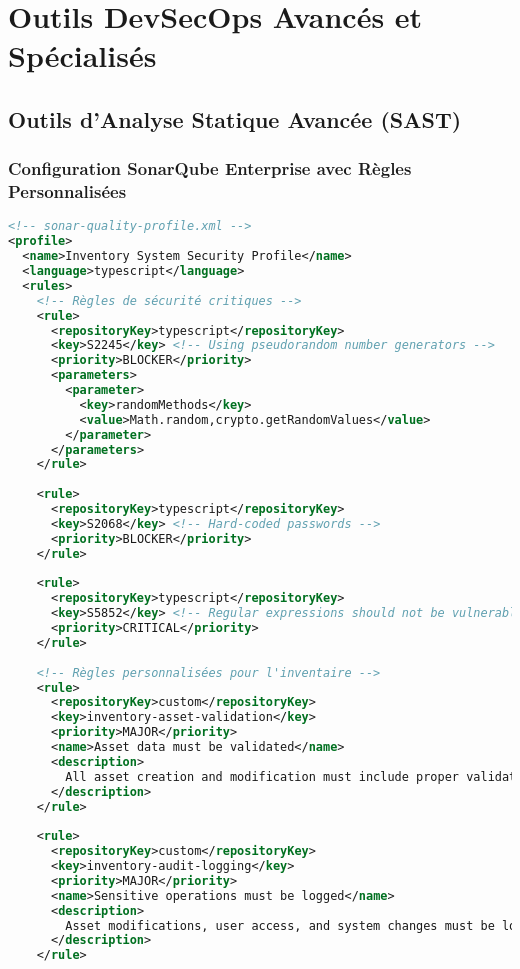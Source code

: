 \documentclass[12pt,a4paper]{report}
\begin{document}
\section{Outils DevSecOps Avancés et Spécialisés}

\subsection{Outils d'Analyse Statique Avancée (SAST)}

\subsubsection{Configuration SonarQube Enterprise avec Règles Personnalisées}

\begin{lstlisting}[language=XML, caption=Configuration SonarQube avancée avec règles métier]
<!-- sonar-quality-profile.xml -->
<profile>
  <name>Inventory System Security Profile</name>
  <language>typescript</language>
  <rules>
    <!-- Règles de sécurité critiques -->
    <rule>
      <repositoryKey>typescript</repositoryKey>
      <key>S2245</key> <!-- Using pseudorandom number generators -->
      <priority>BLOCKER</priority>
      <parameters>
        <parameter>
          <key>randomMethods</key>
          <value>Math.random,crypto.getRandomValues</value>
        </parameter>
      </parameters>
    </rule>
    
    <rule>
      <repositoryKey>typescript</repositoryKey>
      <key>S2068</key> <!-- Hard-coded passwords -->
      <priority>BLOCKER</priority>
    </rule>
    
    <rule>
      <repositoryKey>typescript</repositoryKey>
      <key>S5852</key> <!-- Regular expressions should not be vulnerable -->
      <priority>CRITICAL</priority>
    </rule>
    
    <!-- Règles personnalisées pour l'inventaire -->
    <rule>
      <repositoryKey>custom</repositoryKey>
      <key>inventory-asset-validation</key>
      <priority>MAJOR</priority>
      <name>Asset data must be validated</name>
      <description>
        All asset creation and modification must include proper validation
      </description>
    </rule>
    
    <rule>
      <repositoryKey>custom</repositoryKey>
      <key>inventory-audit-logging</key>
      <priority>MAJOR</priority>
      <name>Sensitive operations must be logged</name>
      <description>
        Asset modifications, user access, and system changes must be logged
      </description>
    </rule>
    

\end{lstlisting}
\end{document}
